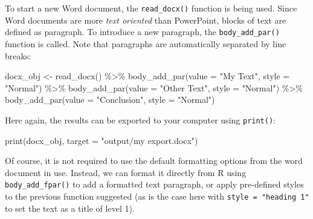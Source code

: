 \documentclass[
]{krantz}
\makeatletter
\newenvironment{Shaded}{\begin{snugshade}}{\end{snugshade}}
\newcommand{\AttributeTok}[1]{\textcolor[rgb]{0.61,0.61,0.61}{#1}}
\newcommand{\FunctionTok}[1]{\textcolor[rgb]{0,0,0}{#1}}
\newcommand{\NormalTok}[1]{#1}
\newcommand{\OtherTok}[1]{\textcolor[rgb]{0.37,0.37,0.37}{#1}}
\newcommand{\SpecialCharTok}[1]{\textcolor[rgb]{0,0,0}{#1}}
\newcommand{\StringTok}[1]{\textcolor[rgb]{0.5,0.5,0.5}{#1}}
\newenvironment{kframe}{%
\medskip{}
\setlength{\fboxsep}{.8em}
 \def\at@end@of@kframe{}%
 \ifinner\ifhmode%
  \def\at@end@of@kframe{\end{minipage}}%
  \begin{minipage}{\columnwidth}%
 \fi\fi%
 \def\FrameCommand##1{\hskip\@totalleftmargin \hskip-\fboxsep
 \colorbox{shadecolor}{##1}\hskip-\fboxsep
     \hskip-\linewidth \hskip-\@totalleftmargin \hskip\columnwidth}%
 \MakeFramed {\advance\hsize-\width
   \@totalleftmargin\z@ \linewidth\hsize
   \@setminipage}}%
 {\par\unskip\endMakeFramed%
 \at@end@of@kframe}
\renewenvironment{Shaded}{\begin{kframe}}{\end{kframe}}
\makeatother
\begin{document}
To start a new Word document, the \texttt{read\_docx()} function is being used. Since Word documents are more \emph{text oriented} than PowerPoint, blocks of text are defined as paragraph. To introduce a new paragraph, the \texttt{body\_add\_par()} function is called. Note that paragraphs are automatically separated by line breaks:

\begin{Shaded}
\begin{Highlighting}[]
\NormalTok{docx\_obj }\OtherTok{\textless{}{-}} \FunctionTok{read\_docx}\NormalTok{() }\SpecialCharTok{\%\textgreater{}\%} 
  \FunctionTok{body\_add\_par}\NormalTok{(}\AttributeTok{value =} \StringTok{"My Text"}\NormalTok{, }\AttributeTok{style =} \StringTok{"Normal"}\NormalTok{) }\SpecialCharTok{\%\textgreater{}\%}
  \FunctionTok{body\_add\_par}\NormalTok{(}\AttributeTok{value =} \StringTok{"Other Text"}\NormalTok{, }\AttributeTok{style =} \StringTok{"Normal"}\NormalTok{) }\SpecialCharTok{\%\textgreater{}\%} 
  \FunctionTok{body\_add\_par}\NormalTok{(}\AttributeTok{value =} \StringTok{"Conclusion"}\NormalTok{, }\AttributeTok{style =} \StringTok{"Normal"}\NormalTok{)}
\end{Highlighting}
\end{Shaded}

Here again, the results can be exported to your computer using \texttt{print()}:

\begin{Shaded}
\begin{Highlighting}[]
\FunctionTok{print}\NormalTok{(docx\_obj, }\AttributeTok{target =} \StringTok{"output/my export.docx"}\NormalTok{)}
\end{Highlighting}
\end{Shaded}

Of course, it is not required to use the default formatting options from the word document in use. Instead, we can format it directly from R using \texttt{body\_add\_fpar()} to add a formatted text paragraph, or apply pre-defined styles to the previous function suggested (as is the case here with \texttt{style\ =\ "heading\ 1"} to set the text as a title of level 1).
\end{document}
